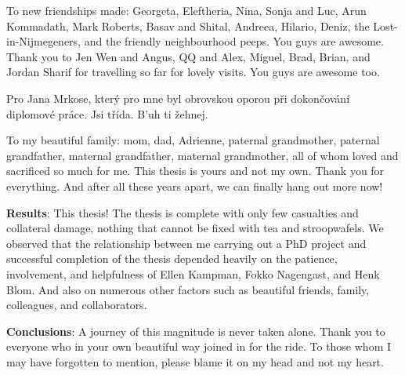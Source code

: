 \noindent To new friendships made: Georgeta, Eleftheria, Nina, Sonja and Luc, Arun Kommadath, Mark Roberts, Basav and Shital, Andreea, Hilario, Deniz, the Lost-in-Nijmegeners, and the friendly neighbourhood peeps. You guys are awesome. Thank you to Jen Wen and Angus, QQ and Alex, Miguel, Brad, Brian, and Jordan Sharif for travelling so far for lovely visits. You guys are awesome too.

\noindent Pro Jana Mrkose, kter{\' y} pro mne byl obrovskou oporou p{\v r}i dokon{\v c}ov{\' a}n{\' i} diplomov{\' e} pr{\' a}ce.
Jsi t{\v r}{\' i}da. B{'u}h ti {\v z}ehnej.

\noindent To my beautiful family: mom, dad, Adrienne, paternal grandmother, paternal grandfather, maternal grandfather, maternal grandmother, all of whom loved and sacrificed so much for me. This thesis is yours and not my own. Thank you for everything. And after all these years apart, we can finally hang out more now!

\noindent \textbf{Results}: This thesis! The thesis is complete with only few casualties and collateral damage, nothing that cannot be fixed with tea and stroopwafels. We observed that the relationship between me carrying out a PhD project and successful completion of the thesis depended heavily on the patience, involvement, and helpfulness of Ellen Kampman, Fokko Nagengast, and Henk Blom. And also on numerous other factors such as beautiful friends, family, colleagues, and collaborators.

\noindent \textbf{Conclusions}: A journey of this magnitude is never taken alone. Thank you to everyone who in your own beautiful way joined in for the ride. To those whom I may have forgotten to mention, please blame it on my head and not my heart.
